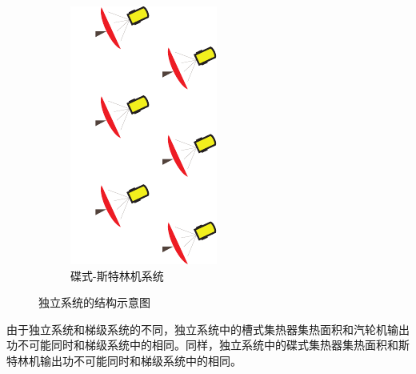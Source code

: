 \begin{figure}[htbp]
\begin{subfigure}[b]{0.26\columnwidth}
	\includegraphics[width = \columnwidth]{fig/Dish-s}
	\caption{碟式-斯特林机系统}\label{fig:DishStirling}
	\end{subfigure}
	
	\caption{独立系统的结构示意图}\label{fig:Stand-alone-systems}
\end{figure}

	由于独立系统和梯级系统的不同，独立系统中的槽式集热器集热面积和汽轮机输出功不可能同时和梯级系统中的相同。同样，独立系统中的碟式集热器集热面积和斯特林机输出功不可能同时和梯级系统中的相同。
	
